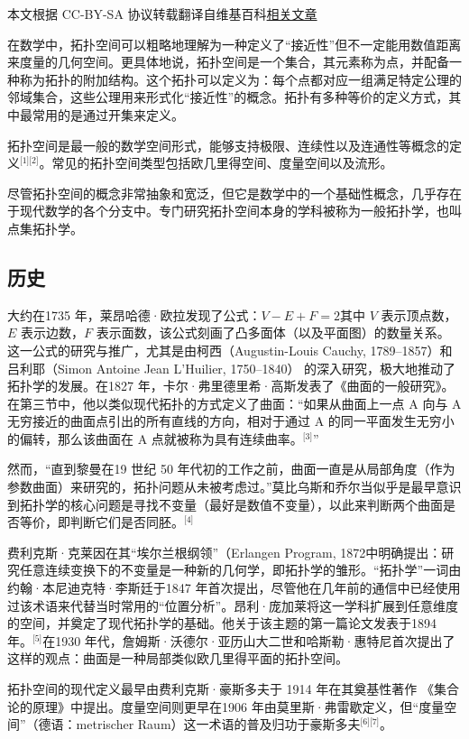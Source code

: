
本文根据 CC-BY-SA 协议转载翻译自维基百科\href{https://en.wikipedia.org/wiki/Topological_space}{相关文章}

在数学中，拓扑空间可以粗略地理解为一种定义了“接近性”但不一定能用数值距离来度量的几何空间。更具体地说，拓扑空间是一个集合，其元素称为点，并配备一种称为拓扑的附加结构。这个拓扑可以定义为：每个点都对应一组满足特定公理的邻域集合，这些公理用来形式化“接近性”的概念。拓扑有多种等价的定义方式，其中最常用的是通过开集来定义。

拓扑空间是最一般的数学空间形式，能够支持极限、连续性以及连通性等概念的定义\(^\text{[1][2]}\)。常见的拓扑空间类型包括欧几里得空间、度量空间以及流形。

尽管拓扑空间的概念非常抽象和宽泛，但它是数学中的一个基础性概念，几乎存在于现代数学的各个分支中。专门研究拓扑空间本身的学科被称为一般拓扑学，也叫点集拓扑学。
\subsection{历史}
大约在1735 年，莱昂哈德·欧拉发现了公式：$V - E + F = 2$其中 $V$ 表示顶点数，$E$ 表示边数，$F$ 表示面数，该公式刻画了凸多面体（以及平面图）的数量关系。这一公式的研究与推广，尤其是由柯西（Augustin-Louis Cauchy, 1789–1857）和吕利耶（Simon Antoine Jean L'Huilier, 1750–1840） 的深入研究，极大地推动了拓扑学的发展。在1827 年，卡尔·弗里德里希·高斯发表了《曲面的一般研究》。在第三节中，他以类似现代拓扑的方式定义了曲面：“如果从曲面上一点 A 向与 A 无穷接近的曲面点引出的所有直线的方向，相对于通过 A 的同一平面发生无穷小的偏转，那么该曲面在 A 点就被称为具有连续曲率。\(^\text{[3]}\)”

然而，“直到黎曼在19 世纪 50 年代初的工作之前，曲面一直是从局部角度（作为参数曲面）来研究的，拓扑问题从未被考虑过。”莫比乌斯和乔尔当似乎是最早意识到拓扑学的核心问题是寻找不变量（最好是数值不变量），以此来判断两个曲面是否等价，即判断它们是否同胚。\(^\text{[4]}\)

费利克斯·克莱因在其“埃尔兰根纲领”（Erlangen Program, 1872中明确提出：研究任意连续变换下的不变量是一种新的几何学，即拓扑学的雏形。“拓扑学”一词由约翰·本尼迪克特·李斯廷于1847 年首次提出，尽管他在几年前的通信中已经使用过该术语来代替当时常用的“位置分析”。昂利·庞加莱将这一学科扩展到任意维度的空间，并奠定了现代拓扑学的基础。他关于该主题的第一篇论文发表于1894 年。\(^\text{[5]}\)在1930 年代，詹姆斯·沃德尔·亚历山大二世和哈斯勒·惠特尼首次提出了这样的观点：曲面是一种局部类似欧几里得平面的拓扑空间。

拓扑空间的现代定义最早由费利克斯·豪斯多夫于 1914 年在其奠基性著作 《集合论的原理》中提出。度量空间则更早在1906 年由莫里斯·弗雷歇定义，但“度量空间”（德语：metrischer Raum）这一术语的普及归功于豪斯多夫\(^\text{[6][7]}\)。
